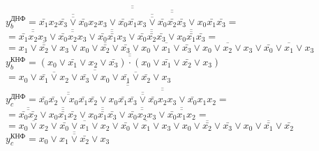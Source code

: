 \documentclass{bmstu}
\begin{document}
	$y^{\text{ДНФ}}_b = \overline{\overline{
			\overline{\overline{
					\bar{x_1} x_2 \bar{x_3} \vee \bar{x_0} x_2 x_3
			}} \vee
			\overline{\overline{
					\overline{\overline{
							\bar{x_0} \bar{x_1} x_3 \vee \bar{x_0} \bar{x_2} \bar{x_3}
					}} \vee x_0 \bar{x_1} \bar{x_3}
			}}
	}} =$ \\
	$= \overline{\overline{\bar{x_1} x_2 x_3}} \vee \overline{\overline{\bar{x_0} x_2 x_3}} \vee \overline{\overline{\bar{x_0} \bar{x_1} x_3}} \vee \overline{\overline{\bar{x_0} \bar{x_2} \bar{x_3}}} \vee \overline{\overline{x_0 \bar{x_1} \bar{x_3}}} =$ \\
	$= \overline{x_1 \vee \bar{x_2} \vee x_3} \vee \overline{x_0 \vee \bar{x_2} \vee \bar{x_3}} \vee \overline{x_0 \vee x_1 \vee \bar{x_3}} \vee \overline{x_0 \vee x_2 \vee x_3} \vee \overline{\bar{x_0} \vee x_1 \vee x_3}$ \\
	$y^{\text{КНФ}}_b = \overline{\overline{(x_0 \vee \bar{x_1} \vee x_2 \vee \bar{x_3}) \cdot (x_0 \vee \bar{x_1} \vee \bar{x_2} \vee x_3)}}$ \\
	$= \overline{\overline{x_0 \vee \bar{x_1} \vee x_2 \vee \bar{x_3}} \vee \overline{x_0 \vee \bar{x_1} \vee \bar{x_2} \vee x_3}}$ \\
	
	$y^{\text{ДНФ}}_c =  \overline{\overline{
			\overline{\overline{
					\bar{x_0} \bar{x_2} \vee x_0 \bar{x_1} \bar{x_2}
			}} \vee
			\overline{\overline{
					\overline{\overline{
							x_0 \bar{x_1} \bar{x_3} \vee \bar{x_0} x_2 x_3
					}} \vee \bar{x_0} x_1 x_2
			}}
	}} =$ \\
	$= \overline{\overline{\bar{x_0} \bar{x_2}}} \vee \overline{\overline{x_0 \bar{x_1} \bar{x_2}}} \vee  \overline{\overline{x_0 \bar{x_1} \bar{x_3}}} \vee  \overline{\overline{\bar{x_0} x_2 x_3}} \vee \overline{\overline{\bar{x_0} x_1 x_2}} =$ \\
	$= \overline{x_0 \vee x_2} \vee \overline{\bar{x_0} \vee x_1 \vee x_2} \vee \overline{\bar{x_0} \vee x_1 \vee x_3} \vee \overline{x_0 \vee \bar{x_2} \vee \bar{x_3}} \vee \overline{x_0 \vee \bar{x_1} \vee \bar{x_2}}$ \\
	$y^{\text{КНФ}}_c = \overline{\overline{x_0 \vee x_1 \vee \bar{x_2} \vee x_3}}$ \\
	
\end{document}
